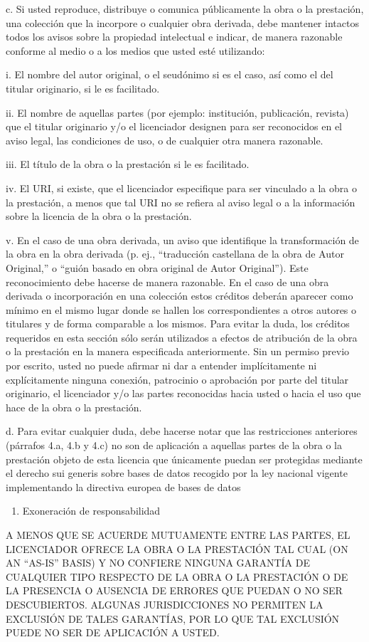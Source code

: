 \documentclass[11pt]{article}
\begin{document}
{{c. Si usted reproduce, distribuye o comunica públicamente la obra o la prestación, una colección que la incorpore o cualquier obra derivada, debe mantener intactos todos los avisos sobre la propiedad intelectual e indicar, de manera razonable conforme al medio o a los medios que usted esté utilizando: 

i. El nombre del autor original, o el seudónimo si es el caso, así como el del titular originario, si le es facilitado. 

ii. El nombre de aquellas partes (por ejemplo: institución, publicación, revista) que el titular originario y/o el licenciador designen para ser reconocidos en el aviso legal, las condiciones de uso, o de cualquier otra manera razonable. 

iii. El título de la obra o la prestación si le es facilitado. 

iv. El URI, si existe, que el licenciador especifique para ser vinculado a la obra o la prestación, a menos que tal URI no se refiera al aviso legal o a la información sobre la licencia de la obra o la prestación. 

v. En el caso de una obra derivada, un aviso que identifique la transformación de la obra en la obra derivada (p. ej., ``traducción castellana de la obra de Autor Original,'' o ``guión basado en obra original de Autor Original''). 
Este reconocimiento debe hacerse de manera razonable. En el caso de una obra derivada o incorporación en una colección estos créditos deberán aparecer como mínimo en el mismo lugar donde se hallen los correspondientes a otros autores o titulares y de forma comparable a los mismos. Para evitar la duda, los créditos requeridos en esta sección sólo serán utilizados a efectos de atribución de la obra o la prestación en la manera especificada anteriormente. Sin un permiso previo por escrito, usted no puede afirmar ni dar a entender implícitamente ni explícitamente ninguna conexión, patrocinio o aprobación por parte del titular originario, el licenciador y/o las partes reconocidas hacia usted o hacia el uso que hace de la obra o la prestación. 

d. Para evitar cualquier duda, debe hacerse notar que las restricciones anteriores (párrafos 4.a, 4.b y 4.c) no son de aplicación a aquellas partes de la obra o la prestación objeto de esta licencia que únicamente puedan ser protegidas mediante el derecho sui generis sobre bases de datos recogido por la ley nacional vigente implementando la directiva europea de bases de datos 

\begin{enumerate}
\item Exoneración de responsabilidad
\end{enumerate}
A MENOS QUE SE ACUERDE MUTUAMENTE ENTRE LAS PARTES, EL LICENCIADOR
OFRECE LA OBRA O LA PRESTACIÓN TAL CUAL (ON AN ``AS-IS'' BASIS) Y NO
CONFIERE NINGUNA GARANTÍA DE CUALQUIER TIPO RESPECTO DE LA OBRA O LA
PRESTACIÓN O DE LA PRESENCIA O AUSENCIA DE ERRORES QUE PUEDAN O NO SER
DESCUBIERTOS. ALGUNAS JURISDICCIONES NO PERMITEN LA EXCLUSIÓN DE TALES
GARANTÍAS, POR LO QUE TAL EXCLUSIÓN PUEDE NO SER DE APLICACIÓN A
USTED.

}}
\end{document}
